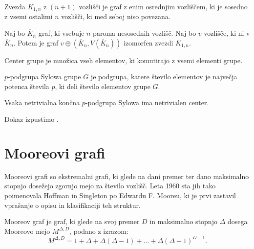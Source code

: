 \documentclass[fin1, tisk]{fmfdelo}
\begin{document}
\begin{definicija}
Zvezda $K_{1, n}$ z $(n+1)$ vozlišči je graf z enim osrednjim vozliščem, ki je sosedno 
z vsemi ostalimi $n$ vozlišči, ki med seboj niso povezana.
\end{definicija}

\begin{zgled}
    Naj bo $\overline{K}_n$ graf, ki vsebuje $n$ paroma nesosednih vozlišč. Naj bo $v$ vozlišče, ki ni v $\overline{K}_n$.
    Potem je graf $v \oplus (\overline{K}_n, V(\overline{K}_n))$ izomorfen zvezdi $K_{1, n}$.
\end{zgled}

\begin{definicija}
    Center grupe je množica vseh elementov, ki komutirajo z vsemi elementi grupe.
\end{definicija}

\begin{definicija}
    $p$-podgrupa Sylowa grupe $G$ je podgrupa, katere število elementov je največja potenca števila $p$, ki deli število elementov grupe $G$.
\end{definicija}

\begin{izrek}\label{iz:netrivialen-center}
    Vsaka netrivialna končna $p$-podgrupa Sylowa ima netrivialen center.
\end{izrek}

\begin{dokaz}
    Dokaz izpustimo \cite{wuthrich2016grouptheory}.
\end{dokaz}
\section{Mooreovi grafi}\label{sec:moore}
Mooreovi grafi so ekstremalni grafi, ki glede na dani premer ter dano 
maksimalno stopnjo dosežejo 
zgornjo mejo za število vozlišč.
Leta 1960 sta jih tako 
poimenovala Hoffman in Singleton po Edwardu F. Mooreu, ki je prvi zastavil vprašanje o 
opisu in klasifikaciji teh struktur.


\begin{definicija}\label{def:moore}
    Mooreov graf je graf, ki glede na svoj premer $D$ in 
    maksimalno stopnjo $\Delta$ dosega Mooreovo mejo $M^{\Delta, D}$, podano z izrazom:
    \begin{equation}\label{eq:moorebound}
        M^{\Delta, D} = 1 + \Delta + \Delta (\Delta - 1) + \ldots + \Delta (\Delta - 1)^{D - 1}.
    \end{equation}
\end{definicija}
\end{document}

